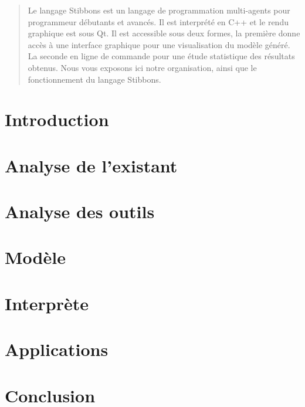 \documentclass[a4paper,11pt]{report}
\begin{document}
\begin{abstract}
Le langage Stibbons est un langage de programmation multi-agents pour programmeur débutants et avancés. Il est interprété en C++ et le rendu graphique est sous Qt. Il est accessible sous deux formes, la première donne accès à une interface graphique pour une visualisation du modèle généré. La seconde en ligne de commande pour une étude statistique des résultats obtenus.
Nous vous exposons ici notre organisation, ainsi que le fonctionnement du langage Stibbons.
\end{abstract}

\chapter{Introduction}


\chapter{Analyse de l'existant}




\chapter{Analyse des outils}







\chapter{Modèle}


\chapter{Interprète}


\chapter{Applications}


\chapter{Conclusion}

\end{document}
